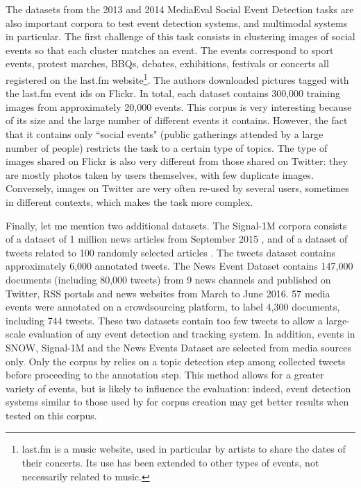 The datasets from the 2013 and 2014 MediaEval Social Event Detection tasks \cite{reuter2013social, petkos2014social} are
also important corpora to test event detection systems, and multimodal systems in particular. The first challenge of
this task consists in clustering images of social events so that each cluster matches an event. The events correspond to
sport events, protest marches, BBQs, debates, exhibitions, festivals or concerts all registered on the last.fm
website\footnote{last.fm is a music website, used in particular by artists to share the dates of their concerts.
Its use has been extended to other types of events, not necessarily related to music.}.
The authors downloaded pictures tagged with the last.fm event ids on Flickr. In total, each dataset contains 300,000 training images from approximately 20,000 events. This corpus is very interesting because of its size and the large number of different events it contains. However, the fact that it contains only ``social events" (public gatherings attended by a large number of people) restricts the task to a certain type of topics. The type of images shared on Flickr is also very different from those shared on Twitter: they are mostly photos taken by users themselves, with few duplicate images. Conversely, images on Twitter are very often re-used by several users, sometimes in different contexts, which makes the task more complex.

Finally, let me mention two additional datasets. The Signal-1M corpora consists of a dataset of 1 million news articles from September 2015 \citep{corney2016million}, and of a dataset of tweets related to 100 randomly selected articles \citep{suarez2018data}. The tweets dataset contains approximately 6,000 annotated tweets. The News Event Dataset \citep{mele2019multi} contains 147,000 documents (including 80,000 tweets) from 9 news channels and published on Twitter, RSS portals and news websites from March to June 2016. 57 media events were annotated on a crowdsourcing platform, to label 4,300 documents, including 744 tweets. These two datasets contain too few tweets to allow a large-scale evaluation of any event detection and tracking system. In addition, events in SNOW, Signal-1M and the News Events Dataset are selected from media sources only. Only the corpus by \citet{mcminn_building_2013} relies on a topic detection step among collected tweets before proceeding to the annotation step. This method allows for a greater variety of events, but is likely to influence the evaluation: indeed, event detection systems similar to those used by \citet{mcminn_building_2013} for corpus creation may get better results when tested on this corpus.


